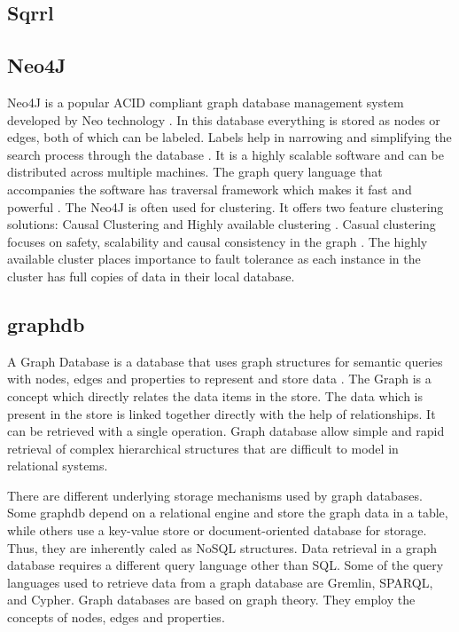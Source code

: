 {     \pv
     
\subsection{Sqrrl}

\pv 

\subsection{Neo4J}

     Neo4J is a popular ACID compliant graph
     database management system developed by Neo technology \cite{www-wiki-neo4j}.
     In this
     database everything is stored as nodes or edges, both of which
     can be labeled. Labels help in narrowing and simplifying the
     search process through the database \cite{www-slideshare}. It is
     a highly scalable software and can be distributed across multiple
     machines.  The graph query language that accompanies the software
     has traversal framework which makes it fast and
     powerful \cite{www-neo4j}. The Neo4J is often used for
     clustering. It offers two feature clustering solutions: Causal
     Clustering and Highly available
     clustering \cite{www-neo4j-causal-cluster}. Casual clustering
     focuses on safety, scalability and causal consistency in the
     graph \cite{www-neo4j-HA-cluster}. The highly available cluster
     places importance to fault tolerance as each instance in the
     cluster has full copies of data in their local database.

     \pv

     
\subsection{graphdb}

     A Graph Database is a database that uses graph structures for
     semantic queries with nodes, edges and properties to represent
     and store data  \cite{www-graphdb}. The Graph is a concept which
     directly relates the data items in the store.  The data which is
     present in the store is linked together directly with the help of
     relationships. It can be retrieved with a single operation.
     Graph database allow simple and rapid retrieval of complex
     hierarchical structures that are difficult to model in relational
     systems.

     There are different underlying storage mechanisms used by graph
     databases.  Some graphdb depend on a relational engine and store
     the graph data in a table, while others use a key-value store or
     document-oriented database for storage. Thus, they are inherently
     caled as NoSQL structures.  Data retrieval in a graph database
     requires a different query language other than SQL. Some of the
     query languages used to retrieve data from a graph database are
     Gremlin, SPARQL, and Cypher.  Graph databases are based on graph
     theory. They employ the concepts of nodes, edges and properties.

}
